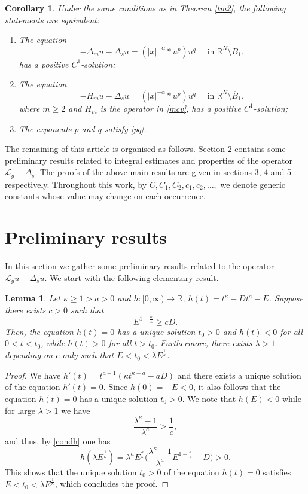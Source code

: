 \documentclass[10pt,a4paper]{amsart}
\numberwithin{equation}{section}
\newcommand{\R}{\mathbb R}
\newcommand{\Lg}{{\mathcal L}_g}
\newtheorem{corollary}[theorem]{Corollary}
\newtheorem{lemma}[theorem]{Lemma}
\begin{document}
\begin{corollary}\label{cor1}
Under the same conditions as in Theorem \ref{tm2}, the following statements are equivalent:
\begin{enumerate}
\item[(i)] The equation 
$$
-\Delta_m u-\Delta_s u=(|x|^{-\alpha}*u^p)u^q \quad\mbox{ in }\R^N\setminus \overline B_1,
$$
has a positive $C^1$-solution;
\item[(ii)] The equation 
$$
-H_m u-\Delta_s u=(|x|^{-\alpha}*u^p)u^q \quad\mbox{ in }\R^N\setminus \overline B_1,
$$
where $m\geq 2$ and $H_m$ is the operator in \eqref{mcv}, 
has a positive $C^1$-solution;
\item[(iii)] The exponents $p$ and $q$ satisfy \eqref{pq}. 
\end{enumerate}

\end{corollary}

The remaining of this article is organised as follows. Section 2 contains some preliminary results related to integral estimates and properties of the operator $\Lg-\Delta_s$. The proofs of the above main results are given in sections 3, 4 and 5 respectively. Throughout this work, by $C, C_1, C_2, c_1, c_2, \dots, $ we denote generic constants whose value may change on each occurrence. 

\section{Preliminary results}

In this section we gather some preliminary results related to the operator $\Lg u-\Delta_s u$. We start with the following elementary result. 
\begin{lemma}\label{lh}
Let $\kappa\geq 1>a>0$ and $h:[0, \infty)\to \R$, $h(t)=t^\kappa-Dt^a-E$. Suppose there exists $c>0$ such that 
\begin{equation}\label{condh}
E^{1-\frac{a}{\kappa}}\geq cD.
\end{equation}
Then, the equation $h(t)=0$ has a unique solution $t_0>0$ and $h(t)<0$ for all $0<t<t_0$, while $h(t)>0$ for all $t>t_0$. Furthermore, there exists $\lambda>1$ depending on $c$ only such that $E<t_0<\lambda E^{\frac{1}{\kappa}}$.
\end{lemma}
\begin{proof}
We have $h'(t)=t^{a-1}(\kappa t^{\kappa-a}-aD)$ and there exists a unique solution of the equation $h'(t)=0$. Since $h(0)=-E<0$, it also follows that the equation $h(t)=0$ has a unique solution $t_0>0$. We note that $h(E)<0$ while for large $\lambda>1$ we have
$$
\frac{\lambda^\kappa-1}{\lambda^a}>\frac{1}{c},$$
and thus, by \eqref{condh} one has
$$
h(\lambda E^{\frac{1}{\kappa}})=\lambda^a E^{\frac{a}{\kappa}} \Big(\frac{\lambda^\kappa-1}{\lambda^a}E^{1-\frac{a}{\kappa}}-D  \Big)>0.
$$
This shows that the unique solution $t_0>0$ of the equation $h(t)=0$ satisfies $E<t_0<\lambda E^{\frac{1}{\kappa}}$, which concludes the proof.
\end{proof}
\end{document}
